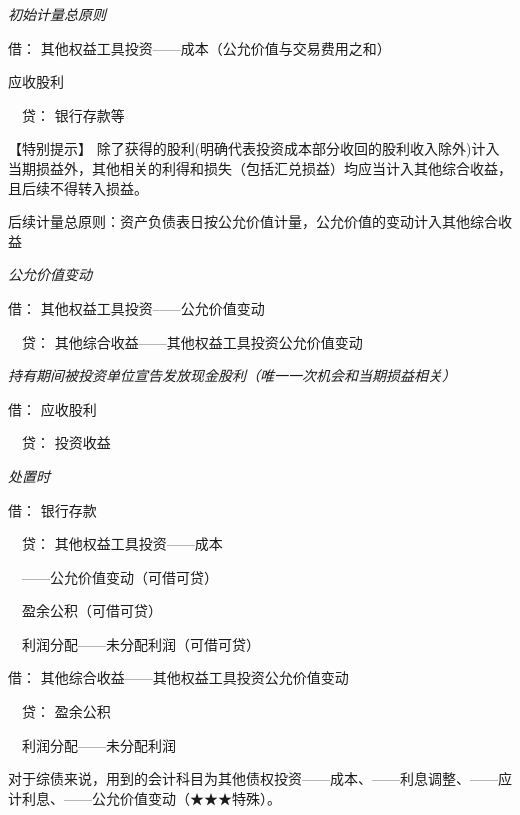 \documentclass[UTF8,12pt]{ctexart}
\newenvironment{Dr}{\noindent 借：}{\par}
\newenvironment{Cr}{\noindent \ \ 贷：}{\par}
\numberwithin{equation}{section} %
\numberwithin{figure}{section}
\numberwithin{table}{section}
\begin{document}
	\textit{初始计量总原则}
	
	\begin{Dr}
		其他权益工具投资——成本（公允价值与交易费用之和）
		
		应收股利
	\end{Dr}
	\begin{Cr}
		银行存款等
	\end{Cr}

	【特别提示】
	除了获得的股利(明确代表投资成本部分收回的股利收入除外)计入当期损益外，其他相关的利得和损失（包括汇兑损益）均应当计入其他综合收益，且后续不得转入损益。
	
	后续计量总原则：资产负债表日按公允价值计量，公允价值的变动计入其他综合收益
	
	\textit{公允价值变动}
	
	\begin{Dr}
		其他权益工具投资——公允价值变动
	\end{Dr}
	\begin{Cr}
		其他综合收益——其他权益工具投资公允价值变动
	\end{Cr}


	\textit{持有期间被投资单位宣告发放现金股利（唯一一次机会和当期损益相关）}
	
	\begin{Dr}
		应收股利
	\end{Dr}
	\begin{Cr}
		投资收益
	\end{Cr}

	
	\textit{处置时}
	
	\begin{Dr}
		银行存款
	\end{Dr}
	\begin{Cr}
		其他权益工具投资——成本
		
		\ \ ——公允价值变动（可借可贷）
		
		\ \ 盈余公积（可借可贷）
		
		\ \ 利润分配——未分配利润（可借可贷）
	\end{Cr}
	
	\begin{Dr}
		其他综合收益——其他权益工具投资公允价值变动
	\end{Dr}
	\begin{Cr}
		盈余公积
		
		\ \ 利润分配——未分配利润
	\end{Cr}
	
	
	对于综债来说，用到的会计科目为其他债权投资——成本、——利息调整、——应计利息、——公允价值变动（★★★特殊）。
	
\end{document}
